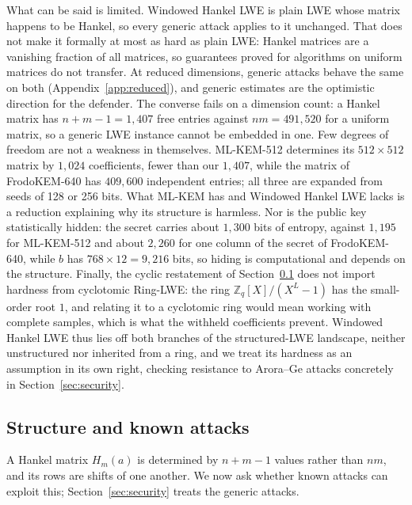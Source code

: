 \documentclass[11pt,a4paper]{article}
\theoremstyle{definition}
\newcommand{\Zq}{\mathbb{Z}_q}
\begin{document}
What can be said is limited. Windowed Hankel LWE is plain LWE whose matrix happens to be Hankel, so every generic attack applies to it unchanged. That does not make it formally at most as hard as plain LWE: Hankel matrices are a vanishing fraction of all matrices, so guarantees proved for algorithms on uniform matrices do not transfer. At reduced dimensions, generic attacks behave the same on both (Appendix~\ref{app:reduced}), and generic estimates are the optimistic direction for the defender. The converse fails on a dimension count: a Hankel matrix has $n + m - 1 = 1{,}407$ free entries against $nm = 491{,}520$ for a uniform matrix, so a generic LWE instance cannot be embedded in one. Few degrees of freedom are not a weakness in themselves. ML-KEM-512 determines its $512 \times 512$ matrix by $1{,}024$ coefficients, fewer than our $1{,}407$, while the matrix of FrodoKEM-640 has $409{,}600$ independent entries; all three are expanded from seeds of 128 or 256 bits. What ML-KEM has and Windowed Hankel LWE lacks is a reduction explaining why its structure is harmless. Nor is the public key statistically hidden: the secret carries about $1{,}300$ bits of entropy, against $1{,}195$ for ML-KEM-512 and about $2{,}260$ for one column of the secret of FrodoKEM-640, while $b$ has $768 \times 12 = 9{,}216$ bits, so hiding is computational and depends on the structure. Finally, the cyclic restatement of Section~\ref{sec:structure} does not import hardness from cyclotomic Ring-LWE: the ring $\Zq[X]/(X^L - 1)$ has the small-order root $1$, and relating it to a cyclotomic ring would mean working with complete samples, which is what the withheld coefficients prevent. Windowed Hankel LWE thus lies off both branches of the structured-LWE landscape, neither unstructured nor inherited from a ring, and we treat its hardness as an assumption in its own right, checking resistance to Arora--Ge attacks concretely in Section~\ref{sec:security}.

\subsection{Structure and known attacks}\label{sec:structure}
A Hankel matrix $H_m(a)$ is determined by $n + m - 1$ values rather than $nm$, and its rows are shifts of one another. We now ask whether known attacks can exploit this; Section~\ref{sec:security} treats the generic attacks.
\end{document}
